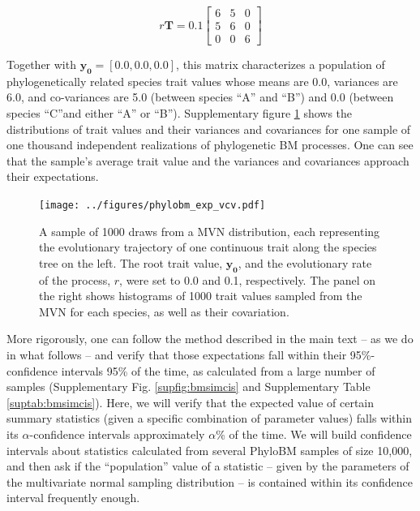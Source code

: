 \documentclass[oneside]{article}
\begin{document}
\begin{equation}
  r\boldsymbol{T} = 0.1
  \begin{bmatrix}
    6 & 5 & 0\\
    5 & 6 & 0\\
    0 & 0 & 6
  \end{bmatrix}
  \label{eq:mat}
\end{equation}

\noindent Together with $\boldsymbol{y_0} = [0.0, 0.0, 0.0]$, this matrix characterizes a population of phylogenetically related species trait values whose means are 0.0, variances are 6.0, and co-variances are 5.0 (between species ``A'' and ``B'') and 0.0 (between species ``C''and either ``A'' or ``B'').
Supplementary figure \ref{fig:bmsim} shows the distributions of trait values and their variances and covariances for one sample of one thousand independent realizations of phylogenetic BM processes. 
One can see that the sample's average trait value and the variances and covariances approach their expectations. 

\begin{figure}[h!]
  \centering
  \texttt{[image: ../figures/phylobm\_exp\_vcv.pdf]}
  \caption{A sample of 1000 draws from a MVN distribution, each representing the evolutionary trajectory of one continuous trait along the species tree on the left.
    The root trait value, $\boldsymbol{y_0}$, and the evolutionary rate of the process, $r$, were set to 0.0 and 0.1, respectively.
    The panel on the right shows histograms of 1000 trait values sampled from the MVN for each species, as well as their covariation.}
  \label{fig:bmsim}
\end{figure}

More rigorously, one can follow the method described in the main text -- as we do in what follows -- and verify that those expectations fall within their 95\%-confidence intervals 95\% of the time, as calculated from a large number of samples (Supplementary Fig. \ref{supfig:bmsimcis} and Supplementary Table \ref{suptab:bmsimcis}).
Here, we will verify that the expected value of certain summary statistics (given a specific combination of parameter values) falls within its $\alpha$-confidence intervals approximately $\alpha$\% of the time.
We will build confidence intervals about statistics calculated from several PhyloBM samples of size 10,000, and then ask if the ``population'' value of  a statistic -- given by the parameters of the multivariate normal sampling distribution -- is contained within its confidence interval frequently enough.
\end{document}
